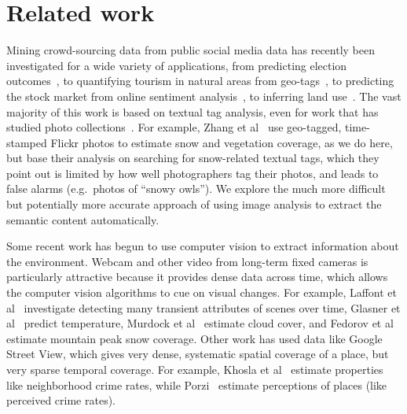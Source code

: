 \section{Related work}

Mining crowd-sourcing data from public social media data has recently
been investigated for a wide variety of applications, from predicting
election outcomes~\cite{you2015multifacetedelections}, to quantifying
tourism in natural areas from geo-tags~\cite{wood2013usingtourism}, to
predicting the stock market from online sentiment
analysis~\cite{bollen11twitter}, to inferring land
use~\cite{vsecerov2015analysis}. The vast majority of this work is
based on textual tag analysis, even for work that has studied photo
collections~\cite{you2015multifacetedelections,vsecerov2015analysis,wood2013usingtourism}.
For example, Zhang et al~\cite{ecology2012www} use geo-tagged,
time-stamped Flickr photos to estimate snow and vegetation coverage,
as we do here, but base their analysis on searching for snow-related
textual tags, which they point out is limited by how well
photographers tag their photos, and leads to false alarms
(e.g.\ photos of ``snowy owls'').  We explore the much more difficult
but potentially more accurate approach of using image analysis to
extract the semantic content automatically.

Some recent work has begun to use computer vision to extract
information about the environment. Webcam and other video from
long-term fixed cameras is particularly attractive because it provides
dense data across time, which allows the computer vision algorithms to
cue on visual changes.  For example, Laffont et
al~\cite{laffont2014transient} investigate detecting many transient
attributes of scenes over time, Glasner et al~\cite{glasner2015hot}
predict temperature, Murdock et al~\cite{murdock2015building, murdock2013webcam2satellite}
estimate cloud cover, and Fedorov et al~\cite{fedorov2015snowwatch,
  fedorov2014snow} estimate mountain peak snow coverage.  Other work
has used data like Google Street View, which gives very dense,
systematic spatial coverage of a place, but very sparse temporal
coverage. For example, Khosla et al~\cite{khosla2014looking} estimate
properties like neighborhood crime rates, while
Porzi~\cite{porzi2015predicting} estimate perceptions of places (like
perceived crime rates).

